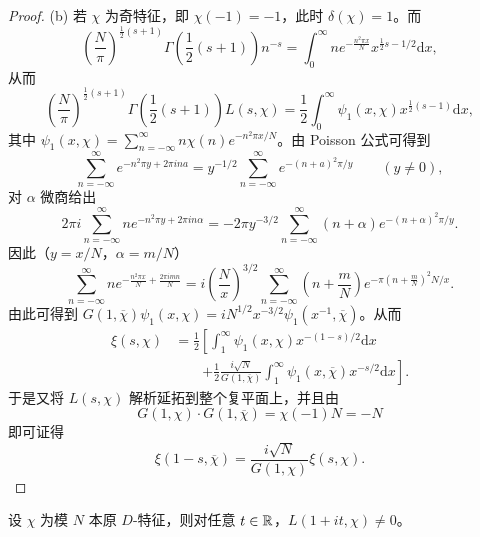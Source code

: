 \begin{proof}
(b) 若 $\chi$ 为奇特征，即 $\chi(-1)=-1$，此时 $\delta(\chi)=1$。而
\[
  \left(\frac{N}{\pi}\right)^{\frac{1}{2}(s+1)}\Gamma\left(\frac{1}{2}(s+1)\right)n^{-s}
  =\int_0^{\infty}ne^{-\frac{n^2\pi x}{N}}x^{\frac{1}{2}s-1/2}\mathrm{d}x,
\]
从而
\[
  \left(\frac{N}{\pi}\right)^{\frac{1}{2}(s+1)}\Gamma\left(\frac{1}{2}(s+1)\right)L(s,\chi)
  =\frac{1}{2}\int_0^{\infty}\psi_1(x,\chi)x^{\frac{1}{2}(s-1)}\mathrm{d}x,
\]
其中 $\psi_1(x,\chi)=\sum_{n=-\infty}^{\infty}n\chi(n)e^{-n^2\pi x/N}$。由 Poisson 公式可得到
\[
  \sum_{n=-\infty}^{\infty}e^{-n^2\pi y+2\pi ina}=y^{-1/2}\sum_{n=-\infty}^{\infty}e^{-(n+a)^2\pi/y}\qquad(y\neq 0),
\]
对 $\alpha$ 微商给出
\[
  2\pi i\sum_{n=-\infty}^{\infty}ne^{-n^2\pi y+2\pi in\alpha}
  =-2\pi y^{-3/2}\sum_{n=-\infty}^{\infty}(n+\alpha)e^{-(n+\alpha)^2\pi/y}.
\]
因此（$y=x/N$，$\alpha=m/N$）
\[
  \sum_{n=-\infty}^{\infty}ne^{-\frac{n^2\pi x}{N}+\frac{2\pi imn}{N}}
  =i\left(\frac{N}{x}\right)^{3/2}\sum_{n=-\infty}^{\infty}\left(n+\frac{m}{N}\right)e^{-\pi\left(n+\frac{m}{N}\right)^2N/x}.
\]
由此可得到 $G(1,\overline{\chi})\psi_1(x,\chi)=iN^{1/2}x^{-3/2}\psi_1(x^{-1},\overline{\chi})$。从而
\begin{align*}
  \xi(s,\chi)&=\frac{1}{2}\left[\int_1^{\infty}\psi_1(x,\chi)x^{-(1-s)/2}\mathrm{d}x\right.\\
  &\qquad\left.+\frac{1}{2}\frac{i\sqrt{N}}{G(1,\overline{\chi})}\int_1^{\infty}\psi_1(x,\overline{\chi})x^{-s/2}\mathrm{d}x\right].
\end{align*}
于是又将 $L(s,\chi)$ 解析延拓到整个复平面上，并且由
\[
  G(1,\chi)\cdot G(1,\overline{\chi})=\chi(-1)N=-N
\]
即可证得
\[
  \xi(1-s,\overline{\chi})=\frac{i\sqrt{N}}{G(1,\chi)}\xi(s,\chi).
\]
\end{proof}

\begin{lemma}\label{lem:ch4-8}
设 $\chi$ 为模 $N$ 本原 $D$-特征，则对任意 $t\in\mathbb{R}$，$L(1+it,\chi)\neq 0$。
\end{lemma}

